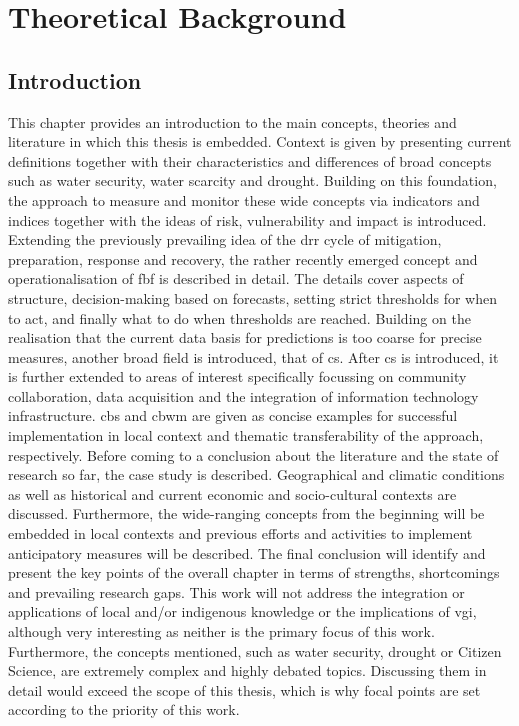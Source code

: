 
\chapter{Theoretical Background} %

\label{chapter2} %

\section{Introduction}

This chapter provides an introduction to the main concepts, theories and literature in which this thesis is embedded. Context is given by presenting current definitions together with their characteristics and differences of broad concepts such as water security, water scarcity and drought. Building on this foundation, the approach to measure and monitor these wide concepts via indicators and indices together with the ideas of risk, vulnerability and impact is introduced.
Extending the previously prevailing idea of the \acrfull*{drr} cycle of mitigation, preparation, response and recovery, the rather recently emerged concept and operationalisation of \acrfull{fbf} is described in detail. The details cover aspects of structure, decision-making based on forecasts, setting strict thresholds for when to act, and finally what to do when thresholds are reached.
Building on the realisation that the current data basis for predictions is too coarse for precise measures, another broad field is introduced, that of \acrfull*{cs}. After \acrshort{cs} is introduced, it is further extended to areas of interest specifically focussing on community collaboration, data acquisition and the integration of information technology infrastructure. \acrfull{cbs} and \acrfull*{cbwm} are given as concise examples for successful implementation in local context and thematic transferability of the approach, respectively.
Before coming to a conclusion about the literature and the state of research so far, the case study is described. Geographical and climatic conditions as well as historical and current economic and socio-cultural contexts are discussed. Furthermore, the wide-ranging concepts from the beginning will be embedded in local contexts and previous efforts and activities to implement anticipatory measures will be described.
The final conclusion will identify and present the key points of the overall chapter in terms of strengths, shortcomings and prevailing research gaps.
This work will not address the integration or applications of local and/or indigenous knowledge or the implications of \acrfull*{vgi}, although very interesting as neither is the primary focus of this work. Furthermore, the concepts mentioned, such as water security, drought or Citizen Science, are extremely complex and highly debated topics. Discussing them in detail would exceed the scope of this thesis, which is why focal points are set according to the priority of this work.

